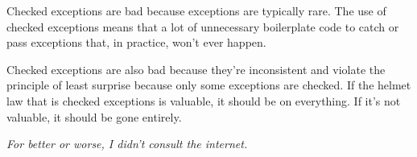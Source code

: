 \documentclass[12pt]{chmullighw}
\begin{document}
\begin{enumerate}
Checked exceptions are bad because exceptions are typically rare. The use of checked exceptions means that a lot of unnecessary boilerplate code to catch or pass exceptions that, in practice, won't ever happen.

Checked exceptions are also bad because they're inconsistent and violate the principle of least surprise because only some exceptions are checked. If the helmet law that is checked exceptions is valuable, it should be on everything. If it's not valuable, it should be gone entirely. 

\textit{For better or worse, I didn't consult the internet.}


\end{enumerate} %
\end{document}
